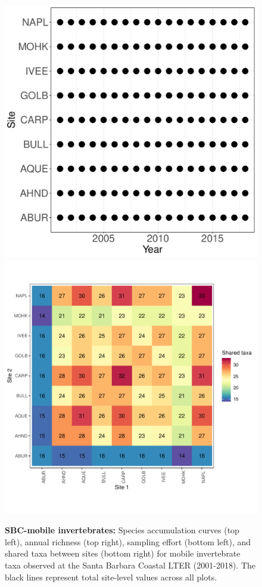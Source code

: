 \documentclass[11pt, oneside]{article}
\begin{document}
\begin{figure}[h!]
\includegraphics[scale = 0.4]{sbc-mobileInverts-castorani_spatiotemporal_sampling_effort.pdf}
\includegraphics[scale = 0.4]{sbc-mobileInverts-castorani_spp_shared.pdf}
\caption{{\bf SBC-mobile invertebrates:} Species accumulation curves (top left),  annual richness (top right), sampling effort (bottom left), and shared taxa between sites (bottom right) for mobile invertebrate taxa observed at the Santa Barbara Coastal LTER (2001-2018). The black lines represent total site-level values across all plots.}
\label{sbc-mobileInverts}
\end{figure}
\end{document}
